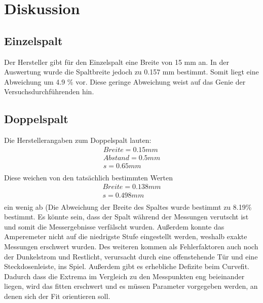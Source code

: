 \section{Diskussion}
\label{sec:Diskussion}

\subsection{Einzelspalt}
    Der Hersteller gibt für den Einzelspalt eine Breite von 15 mm an. In der Auswertung wurde 
    die Spaltbreite jedoch zu 0.157 mm bestimmt. Somit liegt eine Abweichung um 4.9 \% vor.
    Diese geringe Abweichung weist auf das Genie der Versuchsdurchführenden hin.
    
\subsection{Doppelspalt}
    Die Herstellerangaben zum Doppelspalt lauten:
    \begin{align*}
        Breite = 0.15 mm\\
        Abstand = 0.5 mm\\
        s = 0.65 mm\\
    \end{align*}
    Diese weichen von den tatsächlich bestimmten Werten 
    \begin{align*}
        Breite = 0.138 mm\\
        s = 0.498 mm\\
    \end{align*}
    ein wenig ab (Die Abweichung der Breite des Spaltes wurde bestimmt zu 8.19\% bestimmt.
    Es könnte sein, dass 
    der Spalt während der Messungen verutscht ist und somit die Messergebnisse verfälscht wurden.
    Außerdem konnte das Amperemeter nicht auf die niedrigste Stufe eingestellt werden, weshalb
    exakte Messungen erschwert wurden. Des weiteren kommen als Fehlerfaktoren auch noch der 
    Dunkelstrom und Restlicht, verursacht durch eine offenstehende Tür und eine Steckdosenleiste, 
    ins Spiel.
    Außerdem gibt es erhebliche Defizite beim Curvefit. Dadurch dass die Extrema im Vergleich zu den 
    Messpunkten eng beieinander liegen, wird das fitten erschwert und es müssen Parameter vorgegeben 
    werden, an denen sich der Fit orientieren soll.

